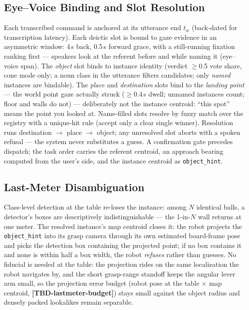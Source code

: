 \documentclass[letterpaper, 10 pt, conference]{ieeeconf}  %
\newcommand{\TBD}[1]{\textbf{\color{red}[TBD-#1]}}
\begin{document}
\subsection{Eye--Voice Binding and Slot Resolution}
Each transcribed command is anchored at its utterance end $t_w$
(back-dated for transcription latency). Each deictic slot is bound to
gaze evidence in an asymmetric window: 4\,s back, 0.5\,s forward
grace, with a still-running fixation ranking first --- speakers look
at the referent before and while naming it (eye--voice span).
The \emph{object} slot binds to instance identity (verdict
$\ge$0.5 vote share, cone mode only; a noun class in the utterance
filters candidates; only \emph{named} instances are bindable). The
\emph{place} and \emph{destination} slots bind to the \emph{landing
point} --- the world point gaze actually struck ($\ge$0.4\,s dwell;
unnamed instances count; floor and walls do not) --- deliberately not
the instance centroid: ``this spot'' means the point you looked at.
Name-filled slots resolve by fuzzy match over the registry with a
unique-hit rule (accept only a clear single winner). Resolution runs
destination $\to$ place $\to$ object; any unresolved slot aborts with
a spoken refusal --- the system never substitutes a guess. A
confirmation gate precedes dispatch; the task order carries the
referent centroid, an approach bearing computed from the user's side,
and the instance centroid as \texttt{object\_hint}.

\subsection{Last-Meter Disambiguation}
Class-level detection at the table re-loses the instance: among $N$
identical balls, a detector's boxes are descriptively
indistinguishable --- the 1-in-$N$ wall returns at one meter. The
resolved instance's map centroid closes it: the robot projects the
\texttt{object\_hint} into its grasp camera through its own estimated
board-frame pose and picks the detection box containing the projected
point; if no box contains it and none is within half a box width, the
robot \emph{refuses} rather than guesses. No fiducial is needed at
the table: the projection rides on the same localization the robot
navigates by, and the short grasp-range standoff keeps the angular
lever arm small, so the projection error budget (robot pose at the
table $\times$ map centroid, \TBD{lastmeter-budget}) stays small
against the object radius and densely packed lookalikes remain
separable.
\end{document}
